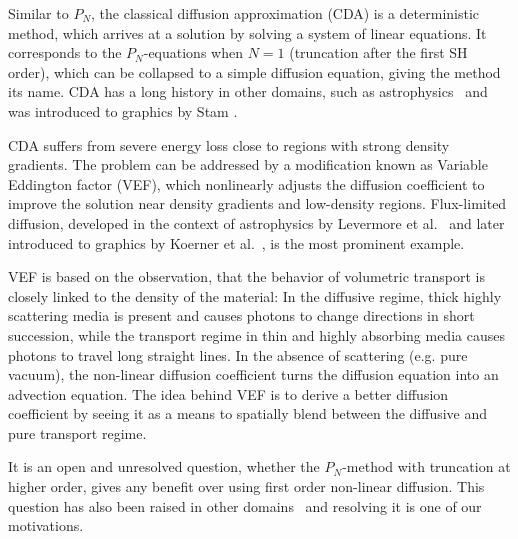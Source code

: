 Similar to $P_N$, the classical diffusion approximation (CDA) is a deterministic method, which arrives at a solution by solving a system of linear equations. It corresponds to the $P_N$-equations when $N=1$ (truncation after the first SH order), which can be collapsed to a simple diffusion equation, giving the method its name. CDA has a long history in other domains, such as astrophysics~\cite{Ishimaru78} and was introduced to graphics by Stam \cite{Stam95}.

CDA suffers from severe energy loss close to regions with strong density gradients. The problem can be addressed by a modification known as Variable Eddington factor (VEF), which nonlinearly adjusts the diffusion coefficient to improve the solution near density gradients and low-density regions. Flux-limited diffusion, developed in the context of astrophysics by Levermore et al.~\cite{Levermore81} and later introduced to graphics by Koerner et al.~\cite{Koerner14}, is the most prominent example.

VEF is based on the observation, that the behavior of volumetric transport is closely linked to the density of the material: In the diffusive regime, thick highly scattering media is present and causes photons to change directions in short succession, while the transport regime in thin and highly absorbing media causes photons to travel long straight lines. In the absence of scattering (e.g. pure vacuum), the non-linear diffusion coefficient turns the diffusion equation into an advection equation. The idea behind VEF is to derive a better diffusion coefficient by seeing it as a means to spatially blend between the diffusive and pure transport regime.

It is an open and unresolved question, whether the $P_N$-method with truncation at higher order, gives any benefit over using first order non-linear diffusion. This question has also been raised in other domains~\cite{Olson00} and resolving it is one of our motivations.

\vspace{1in}




